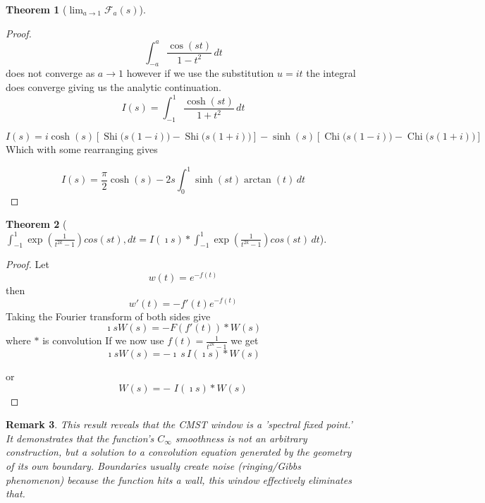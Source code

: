 \documentclass[11pt]{article}
\theoremstyle{breakdef}
\newtheorem{theorem}{Theorem}[section]
\newtheorem{remark}[theorem]{Remark}
\begin{document}
\begin{theorem}[$\lim_{a \to 1} \mathcal{F}_a(s)$]
\end{theorem}
\begin{proof}
\begin{equation}
\int_{-a}^a \frac{\cos (s t)}{1-t^2} \, dt
\end{equation}
does not converge as $a \to 1$ however if we use the substitution $u = i t$ the integral does converge giving us the analytic continuation.
\begin{equation}
    I(s) = \int_{-1}^{1} \frac{\cosh(st)}{1+t^2} \, dt
\end{equation}

\begin{equation}
    I(s) = i \cosh(s) \left[ \operatorname{Shi}\big(s(1-i)\big) - \operatorname{Shi}\big(s(1+i)\big) \right] 
    - \sinh(s) \left[ \operatorname{Chi}\big(s(1-i)\big) - \operatorname{Chi}\big(s(1+i)\big) \right]
\end{equation}
Which with some rearranging gives

\begin{equation}
    I(s) = \frac{\pi}{2} \cosh(s) - 2s \int_{0}^{1} \sinh(st) \arctan(t) \, dt
\end{equation}

\end{proof}


\begin{theorem}[$ \int_{-1}^{1} \exp\left( \frac{1}{t^{2k}-1} \right)cos(st), dt  =I(\imath s) \ast \int_{-1}^{1} \exp\left( \frac{1}{t^{2k}-1} \right)cos(st) \, dt $]
\end{theorem}
\begin{proof}
Let
\begin{equation}
w(t) = e^{-f(t)}
\end{equation}
then
\begin{equation}
w'(t) = -f'(t)e^{-f(t)}
\end{equation}
Taking the Fourier transform of both sides give
\begin{equation}
\imath s W(s) = - F(f'(t)) \ast W(s)
\end{equation}
where $\ast$ is convolution 
If we now use $f(t) =  \frac{1}{t^{2k}-1} $ we get
\begin{equation}
\imath s W(s) = -\imath \,  s \, I(\imath s) \ast W(s)
\end{equation}

or
\begin{equation}
W(s) = - \, \, I(\imath s) \ast W(s)
\end{equation}
\end{proof}
\begin{remark}
This result reveals that the CMST window is a 'spectral fixed point.' It demonstrates that the function's $C_\infty$ smoothness is not an arbitrary construction, but a solution to a convolution equation generated by the geometry of its own boundary. Boundaries usually create noise (ringing/Gibbs phenomenon) because the function hits a wall, this window effectively eliminates that.
\end{remark}
\end{document}
